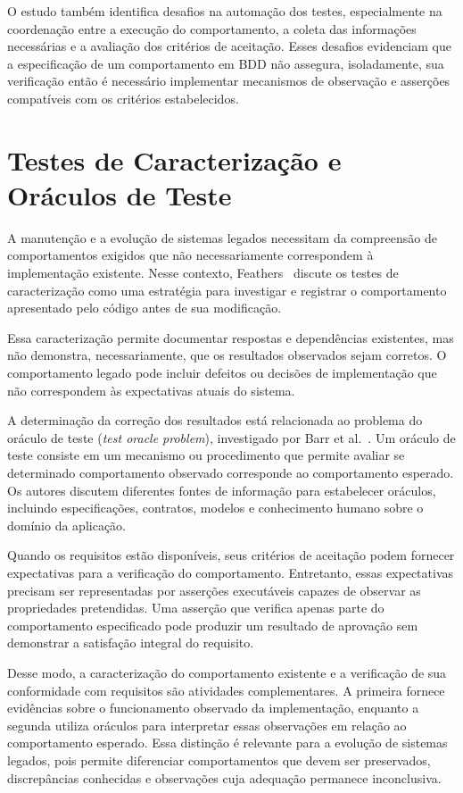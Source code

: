O estudo também identifica desafios na automação dos testes, especialmente na coordenação entre a execução do comportamento, a coleta das informações necessárias e a avaliação dos critérios de aceitação. Esses desafios evidenciam que a especificação de um comportamento em BDD não assegura, isoladamente, sua verificação então é necessário implementar mecanismos de observação e asserções compatíveis com os critérios estabelecidos.


\section{Testes de Caracterização e Oráculos de Teste}

A manutenção e a evolução de sistemas legados necessitam da compreensão de comportamentos exigidos que não necessariamente correspondem à implementação existente. Nesse contexto, Feathers~\cite{Feathers2004} discute os testes de caracterização como uma estratégia para investigar e registrar o comportamento apresentado pelo código antes de sua modificação.

Essa caracterização permite documentar respostas e dependências existentes, mas não demonstra, necessariamente, que os resultados observados sejam corretos. O comportamento legado pode incluir defeitos ou decisões de implementação que não correspondem às expectativas atuais do sistema.

A determinação da correção dos resultados está relacionada ao problema do oráculo de teste (\textit{test oracle problem}), investigado por Barr et al.~\cite{Barr2015}. Um oráculo de teste consiste em um mecanismo ou procedimento que permite avaliar se determinado comportamento observado corresponde ao comportamento esperado. Os autores discutem diferentes fontes de informação para estabelecer oráculos, incluindo especificações, contratos, modelos e conhecimento humano sobre o domínio da aplicação.

Quando os requisitos estão disponíveis, seus critérios de aceitação podem fornecer expectativas para a verificação do comportamento. Entretanto, essas expectativas precisam ser representadas por asserções executáveis capazes de observar as propriedades pretendidas. Uma asserção que verifica apenas parte do comportamento especificado pode produzir um resultado de aprovação sem demonstrar a satisfação integral do requisito.

Desse modo, a caracterização do comportamento existente e a verificação de sua conformidade com requisitos são atividades complementares. A primeira fornece evidências sobre o funcionamento observado da implementação, enquanto a segunda utiliza oráculos para interpretar essas observações em relação ao comportamento esperado. Essa distinção é relevante para a evolução de sistemas legados, pois permite diferenciar comportamentos que devem ser preservados, discrepâncias conhecidas e observações cuja adequação permanece inconclusiva.

